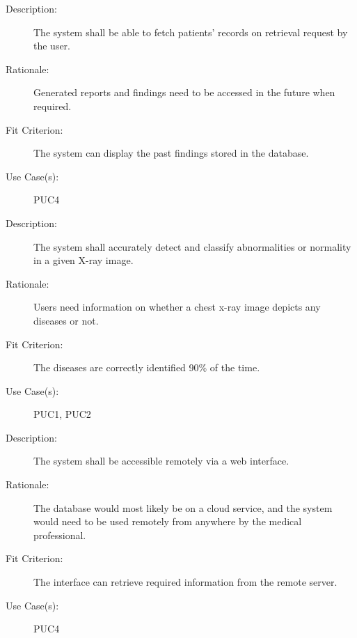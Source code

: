 \documentclass[12pt]{article}
\begin{document}
\begin{enumerate}[label=FR\arabic*., series=frs]
\begin{item}
\begin{description}
            
            \item[Description:] The system shall be able to fetch patients’ records on retrieval request by the user.
            \item[Rationale:] Generated reports and findings need to be accessed in the future when required.
            \item[Fit Criterion:] The system can display the past findings stored in the database.
            \item[Use Case(s):] PUC4
        \end{description}
    \end{item}
    \begin{item}
        \begin{description}
            \item[Description:] \hypertarget{FR5}{The system shall accurately detect and classify abnormalities or normality in a given X-ray image.}
            \item[Rationale:] Users need information on whether a chest x-ray image depicts any diseases or not.
            \item[Fit Criterion:] The diseases are correctly identified 90\% of the time.
            \item[Use Case(s):] PUC1, PUC2
        \end{description}
    \end{item}
    \begin{item}
        \begin{description}
            \item[Description:] The system shall be accessible remotely via a web interface.
            \item[Rationale:] The database would most likely be on a cloud service, and the system would need to be used remotely from anywhere by the medical professional.
            \item[Fit Criterion:] The interface can retrieve required information from the remote server.
            \item[Use Case(s):] PUC4
        \end{description}
    \end{item}
    \begin{item}
        \begin{description}

\end{description}
\end{item}
\end{enumerate}
\end{document}
